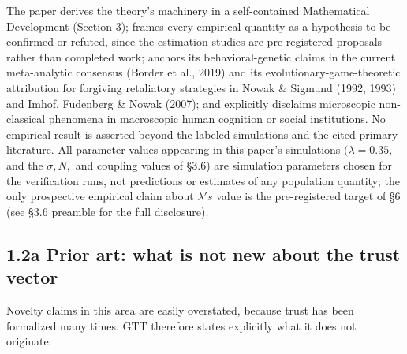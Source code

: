 \documentclass[11pt,twocolumn]{article}
\theoremstyle{gttdef}
\theoremstyle{gttplain}
\begin{document}
The paper derives the theory's machinery in a self-contained Mathematical Development (Section 3); frames every empirical quantity as a hypothesis to be confirmed or refuted, since the estimation studies are pre-registered proposals rather than completed work; anchors its behavioral-genetic claims in the current meta-analytic consensus (Border et al., 2019) and its evolutionary-game-theoretic attribution for forgiving retaliatory strategies in Nowak \& Sigmund (1992, 1993) and Imhof, Fudenberg \& Nowak (2007); and explicitly disclaims microscopic non-classical phenomena in macroscopic human cognition or social institutions. No empirical result is asserted beyond the labeled simulations and the cited primary literature. All parameter values appearing in this paper's simulations $(\lambda = 0.35,$ and the $\sigma, N,$ and coupling values of \S{}3.6) are simulation parameters chosen for the verification runs, not predictions or estimates of any population quantity; the only prospective empirical claim about $\lambda's$ value is the pre-registered target of \S{}6 (see \S{}3.6 preamble for the full disclosure).

\subsection*{1.2a Prior art: what is not new about the trust vector}

Novelty claims in this area are easily overstated, because trust has been formalized many times. GTT therefore states explicitly what it does not originate:
\end{document}
